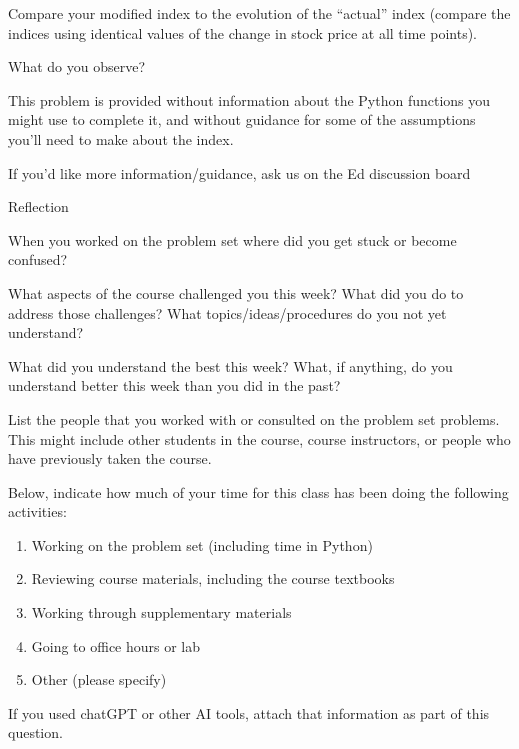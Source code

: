 \documentclass[12pt,letterpaper,noanswers]{exam}
\begin{document}
\begin{questions}
\begin{parts}
Compare your modified index to the evolution of the ``actual'' index (compare the indices using identical values of the change in stock price at all time points).

\item What do you observe?



\end{parts}


This problem is provided without information about the Python functions you might use to complete it, and without guidance for some of the assumptions you'll need to make about the index.  

If you'd like more information/guidance, ask us on the Ed discussion board

\question Reflection
\begin{parts}
\item When you worked on the problem set where did you get stuck or become confused?
\item What aspects of the course challenged you this week?  What did you do to address those challenges?  What topics/ideas/procedures do you not yet understand?
\item What did you understand the best this week?  What, if anything, do you understand better this week than you did in the past?
\item List the people that you worked with or consulted on the problem set problems.  This might include other students in the course, course instructors, or people who have previously taken the course.
\item Below, indicate how much of your time for this class has been doing the following activities:
	\begin{enumerate}
	\item Working on the problem set (including time in Python)
	\item Reviewing course materials, including the course textbooks
	\item Working through supplementary materials
	\item Going to office hours or lab
	\item Other (please specify)
	\end{enumerate}
\item If you used chatGPT or other AI tools, attach that information as part of this question.
\end{parts}

\end{questions}





\end{document}
